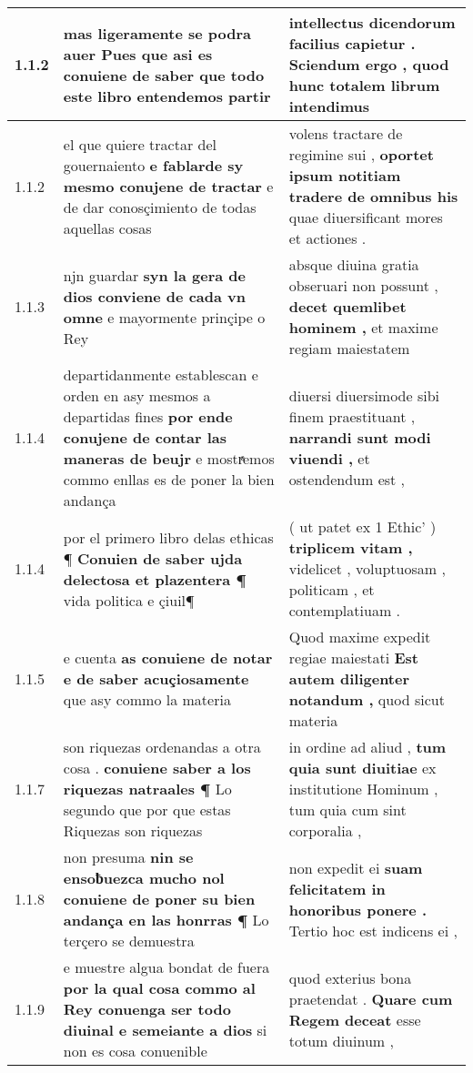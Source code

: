 \begin{tabular}{|p{1cm}|p{6.5cm}|p{6.5cm}|}

\hline
1.1.2 & mas ligeramente se podra auer \textbf{ Pues que asi es conuiene de saber } que todo este libro entendemos partir & intellectus dicendorum facilius capietur . \textbf{ Sciendum ergo , } quod hunc totalem librum intendimus \\\hline
1.1.2 & el que quiere tractar del gouernaiento \textbf{ e fablarde sy mesmo conujene de tractar } e de dar conosçimiento de todas aquellas cosas & volens tractare de regimine sui , \textbf{ oportet ipsum notitiam tradere de omnibus his } quae diuersificant mores et actiones . \\\hline
1.1.3 & njn guardar \textbf{ syn la gera de dios conviene de cada vn omne } e mayormente prinçipe o Rey & absque diuina gratia obseruari non possunt , \textbf{ decet quemlibet hominem , } et maxime regiam maiestatem \\\hline
1.1.4 & departidanmente establescan e orden en asy mesmos a departidas fines \textbf{ por ende conujene de contar las maneras de beujr } e mostrͣemos commo enllas es de poner la bien andança & diuersi diuersimode sibi finem praestituant , \textbf{ narrandi sunt modi viuendi , } et ostendendum est , \\\hline
1.1.4 & por el primero libro delas ethicas ¶ \textbf{ Conuien de saber ujda delectosa et plazentera ¶ } vida politica e çiuil¶ & ( ut patet ex 1 Ethic’ ) \textbf{ triplicem vitam , } videlicet , voluptuosam , politicam , et contemplatiuam . \\\hline
1.1.5 & e cuenta \textbf{ as conuiene de notar e de saber acuçiosamente } que asy commo la materia & Quod maxime expedit regiae maiestati \textbf{ Est autem diligenter notandum , } quod sicut materia \\\hline
1.1.7 & son riquezas ordenandas a otra cosa . \textbf{ conuiene saber a los riquezas natraales ¶ } Lo segundo que por que estas Riquezas son riquezas & in ordine ad aliud , \textbf{ tum quia sunt diuitiae } ex institutione Hominum , tum quia cum sint corporalia , \\\hline
1.1.8 & non presuma \textbf{ nin se ensoƀuezca mucho nol conuiene de poner su bien andança en las honrras ¶ } Lo terçero se demuestra & non expedit ei \textbf{ suam felicitatem in honoribus ponere . } Tertio hoc est indicens ei , \\\hline
1.1.9 & e muestre algua bondat de fuera \textbf{ por la qual cosa commo al Rey conuenga ser todo diuinal e semeiante a dios } si non es cosa conuenible & quod exterius bona praetendat . \textbf{ Quare cum Regem deceat } esse totum diuinum , \\\hline

\end{tabular}
